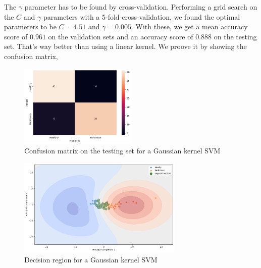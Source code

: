 The $\gamma$ parameter has to be found by cross-validation. Performing a grid search on the $C$ and $\gamma$ parameters with a 5-fold cross-validation, we found the optimal parameters to be $C = 4.51$ and $\gamma = 0.005$. With these, we get a mean accuracy score of $0.961$ on the validation sets and an accuracy score of $0.888$ on the testing set. That's way better than using a linear kernel. We proove it by showing the confusion matrix, 

\begin{figure}[H]
	\centering
	\includegraphics[width=0.5\textwidth]{figures/kernel_svm_cm.png}
	\caption{Confusion matrix on the testing set for a Gaussian kernel SVM}
	\label{fig:kernel-svm-cm}
\end{figure}

\begin{figure}[H]
	\centering
	\includegraphics[width=0.7\textwidth]{figures/kernel_svm_region.png}
	\caption{Decision region for a Gaussian kernel SVM}
	\label{fig:kernel-svm-region}
\end{figure}
